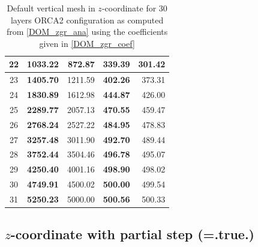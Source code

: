 {\begin{table}
\begin{center}
\begin{tabular}{c||r|r|r|r}
22	& 	\textbf{1033.22}&	 872.87 & 	\textbf{339.39} & 	301.42 \\ \hline
23	& 	\textbf{1405.70}&	1211.59 & \textbf{402.26} & 	373.31 \\ \hline
24	& 	\textbf{1830.89}&	1612.98 & \textbf{444.87} & 	426.00 \\ \hline
25	& 	\textbf{2289.77}&	2057.13 & \textbf{470.55} & 	459.47 \\ \hline
26	& 	\textbf{2768.24}&	2527.22 & \textbf{484.95} & 	478.83 \\ \hline
27	& 	\textbf{3257.48}&	3011.90 & \textbf{492.70} & 	489.44 \\ \hline
28	& 	\textbf{3752.44}&	3504.46 & \textbf{496.78} & 	495.07 \\ \hline
29	& 	\textbf{4250.40}&	4001.16 & \textbf{498.90} & 	498.02 \\ \hline
30	& 	\textbf{4749.91}&	4500.02 & \textbf{500.00} &	499.54 \\ \hline
31	& 	\textbf{5250.23}&	5000.00 &	\textbf{500.56} &	500.33 \\ \hline
\end{tabular} \end{center} 
\caption{ \label{Tab_orca_zgr}   
Default vertical mesh in $z$-coordinate for 30 layers ORCA2 configuration as computed 
from \eqref{DOM_zgr_ana} using the coefficients given in \eqref{DOM_zgr_coef}}
\end{table}

\subsection   [$z$-coordinate with partial step (\np{ln\_zps})]
			{$z$-coordinate with partial step (=.true.)}
\label{DOM_zps}

}
